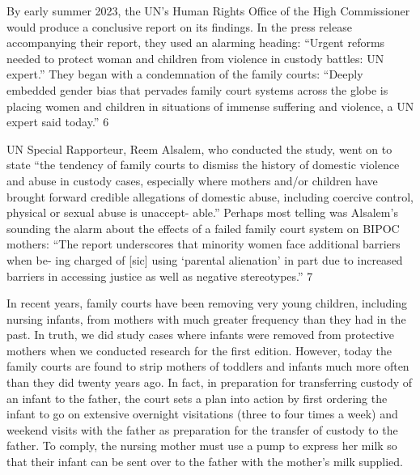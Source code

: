 By early summer 2023, the UN’s Human Rights Office of the High
Commissioner would produce a conclusive report on its findings. In the
press release accompanying their report, they used an alarming heading:
“Urgent reforms needed to protect woman and children from violence
in custody battles: UN expert.” They began with a condemnation of the
family courts: “Deeply embedded gender bias that pervades family court
systems across the globe is placing women and children in situations of
immense suffering and violence, a UN expert said today.” 6 \pfl{}


UN Special Rapporteur, Reem Alsalem, who conducted the study,
went on to state “the tendency of family courts to dismiss the history of
domestic violence and abuse in custody cases, especially where mothers
and/or children have brought forward credible allegations of domestic
abuse, including coercive control, physical or sexual abuse is unaccept-
able.” Perhaps most telling was Alsalem’s sounding the alarm about the
effects of a failed family court system on BIPOC mothers: “The report
underscores that minority women face additional barriers when be-
ing charged of [sic] using ‘parental alienation’ in part due to increased
barriers in accessing justice as well as negative stereotypes.” 7 \pfl{}


In recent years, family courts have been removing very young children,
including nursing infants, from mothers with much greater frequency
than they had in the past. In truth, we did study cases where infants were
removed from protective mothers when we conducted research for the
first edition. However, today the family courts are found to strip mothers
of toddlers and infants much more often than they did twenty years ago.
In fact, in preparation for transferring custody of an infant to the father,
the court sets a plan into action by first ordering the infant to go on
extensive overnight visitations (three to four times a week) and weekend
visits with the father as preparation for the transfer of custody to the
father. To comply, the nursing mother must use a pump to express her
milk so that their infant can be sent over to the father with the mother’s
milk supplied. \pfl{}


